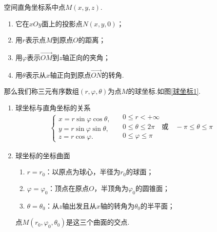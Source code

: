 空间直角坐标系中点$M(x,y,z).$
\begin{enumerate}[(1)]
	\setlength{\itemindent}{3em}
	\setlength{\topsep}{0.01em}
	\setlength{\itemsep}{0.01em}
	\item 它在$xOy$面上的投影点$N(x,y,0)$；
	\item 用$r$表示点$M$到原点$O$的距离；
	\item 用$\varphi $表示$\overrightarrow{OM}$到$z$轴正向的夹角；
	\item 用$\theta $表示从$x$轴正向到原点$\overrightarrow{ON}$的转角.
\end{enumerate}
\par 那么我们称三元有序数组$(r ,\varphi ,\theta )$为点$M$的{\color{dy}球坐标}.如图\ref{球坐标1}.
\begin{enumerate}[]
	\setlength{\topsep}{0.01em}
	\setlength{\itemsep}{0.01em}
	\item {\color{dy}球坐标与直角坐标的关系}
	\begin{equation}
	\begin{cases}
	x=r\sin \varphi  \cos\theta,\\
	y=r\sin \varphi  \sin\theta ,\\
	z=r\cos \varphi.
	\end{cases}
	\quad 
	\begin{array}{l}
	0 \le r < +\infty\\ 
	0 \le \theta \le 2\pi \quad \mbox{或} \quad -\pi \le \theta \le \pi \\ 
	0 \le \varphi \le \pi\\ 
	\end{array} 
	\end{equation}
	\item {\color{dy}球坐标的坐标曲面}
	\begin{enumerate}[]
		\setlength{\itemindent}{1em}
		\setlength{\topsep}{0.01em}
		\setlength{\itemsep}{0.01em}
		\item $r = r_0 $：以原点为球心，半径为$r_0$的{\color{dy}球面}；
		\item $\varphi  =\varphi_0$：顶点在原点$O$，半顶角为$\varphi_0$的{\color{dy}圆锥面}；
		\item $\theta =\theta_0$：从$z$轴出发且从$x$轴的转角为$\theta_0$的{\color{dy}半平面}；
	\end{enumerate}
	点$M(r_0 ,\varphi_0 ,\theta_0 )$是这三个曲面的交点.
\end{enumerate}

